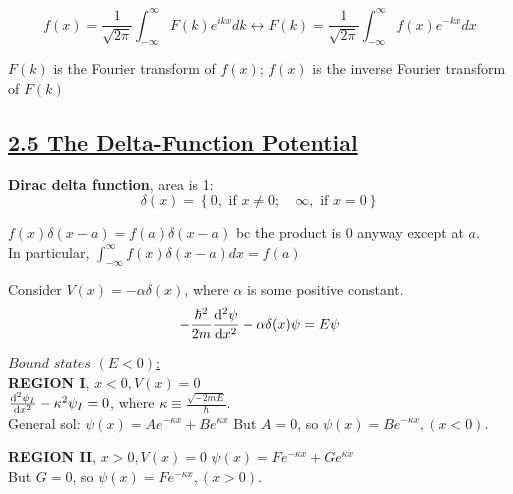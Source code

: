 $$f(x) = \frac{1}{\sqrt{2 \pi}} \int_{-\infty}^{\infty} F(k) e^{ikx} dk \leftrightarrow F(k) = \frac{1}{\sqrt{2\pi}} \int_{-\infty}^{\infty} f(x) e^{-kx} dx$$

$F(k)$ is the Fourier transform of $f(x)$; $f(x)$ is the inverse Fourier transform of $F(k)$ \\



\subsection{\underline{2.5 The Delta-Function Potential}}

\textbf{Dirac delta function}, area is 1:
$$\delta(x) = \left\{ 0, \textrm { if } x \neq 0; \quad \infty, \textrm{ if } x = 0 \right\}$$

$f(x) \delta(x - a) = f(a) \delta(x - a)$ bc the product is 0 anyway except at $a$. \\

In particular, $\int_{-\infty}^{\infty} f(x) \delta(x-a) dx = f(a)$

Consider $V(x) = -\alpha \delta(x)$, where $\alpha$ is some positive constant. \\

$$-\frac{\hbar^2}{2m} \dv[2]{\psi}{x} - \alpha \delta(x) \psi = E \psi$$

\underline{$\textit{Bound states } (E < 0)$:} \\

\textbf{REGION I}, $x < 0, V(x) = 0$ \\
$\dv[2]{\psi_{I}}{x} - \kappa^2 \psi_{I} = 0$, where $\kappa \equiv \frac{\sqrt{-2mE}}{\hbar}$. \\

General sol: $\psi(x) = Ae^{-\kappa x} + Be^{\kappa x}$
But $A = 0$, so $\psi(x) = Be^{-\kappa x}, (x < 0)$.

\textbf{REGION II}, $x > 0, V(x) = 0$
$\psi(x) = Fe^{-\kappa x} + Ge^{\kappa x}$ \\
But $G = 0$, so $\psi(x) = Fe^{-\kappa x}, (x > 0)$.

